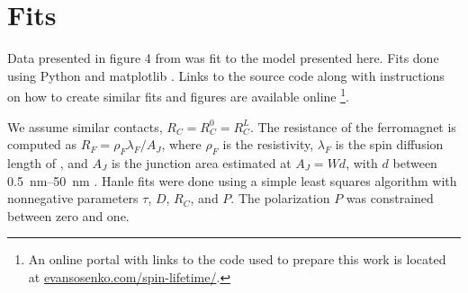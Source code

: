 \section{Fits}
\label{s:fits}

Data presented in figure 4 from \cite{PhysRevLett.105.167202}
was fit to the model presented here.
Fits done using Python and matplotlib \cite{Hunter:2007}.
Links to the source code along with instructions
on how to create similar fits and figures are available online
\footnote{
  An online portal with links to the code used to prepare this work is located at
  \href{http://evansosenko.com/spin-lifetime/}{evansosenko.com/spin-lifetime/}.
}.

We assume similar contacts, $R_C = R_C^0 = R_C^L$.
The resistance of the ferromagnet  is computed as
$R_F = ρ_F λ_F / A_J$,
where $ρ_F$ is the  resistivity,
$λ_F$ is the spin diffusion length of ,
and $A_J$ is the junction area estimated at $A_J = W d$,
with $d$ between \SIrange[range-phrase={ and }]{0.5}{50}{\nano \meter}
\cite{PhysRevLett.105.167202}.
Hanle fits were done using a simple least squares algorithm
with nonnegative parameters $τ$, $D$, $R_C$, and $P$.
The polarization $P$ was constrained between zero and one.

